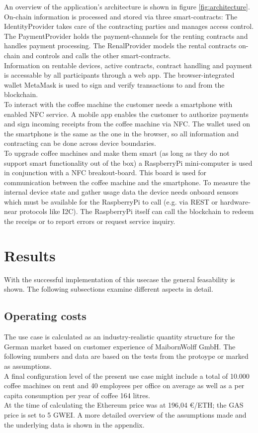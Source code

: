 \documentclass[conference]{IEEEtran}
\begin{document}
An overview of the application's architecture is shown in figure \ref{fig:architecture}. On-chain information is processed and stored via three smart-contracts: The IdentityProvider takes care of the contracting parties and manages access control. The PaymentProvider holds the payment-channels for the renting contracts and handles payment processing. The RenalProvider models the rental contracts on-chain and controls and calls the other smart-contracts.\\
Information on rentable devices, active contracts, contract handling and payment is accessable by all participants through a web app. The browser-integrated wallet MetaMask is used to sign and verify transactions to and from the blockchain.\\
To interact with the coffee machine the customer needs a smartphone with enabled NFC service. A mobile app enables the customer to authorize payments and sign incoming receipts from the coffee machine via NFC. The wallet used on the smartphone is the same as the one in the browser, so all information and contracting can be done across device boundaries.\\
To upgrade coffee machines and make them smart (as long as they do not support smart functionality out of the box) a RaspberryPi mini-computer is used in conjunction with a NFC breakout-board. This board is used for communication between the coffee machine and the smartphone. To measure the internal device state and gather usage data the device needs onboard sensors which must be available for the RaspberryPi to call (e.g. via REST or hardware-near protocols like I2C). The RaspberryPi itself can call the blockchain to redeem the receips or to report errors or request service inquiry.\\



\section{Results}
With the successful implementation of this usecase the general feasability is shown. The following subsections examine different aspects in detail.

\subsection{Operating costs}
The use case is calculated as an industry-realistic quantity structure for the German market based on customer experience of MaibornWolff GmbH. The following numbers and data are based on the tests from the protoype or marked as assumptions.\\
A final configuration level of the present use case might include a total of 10.000 coffee machines on rent and 40 employees per office on average as well as a per capita consumption per year of coffee 164 litres.\\
At the time of calculating the Ethereum price was at 196,04 €/ETH; the GAS price is set to 5 GWEI. A more detailed overview of the assumptions made and the underlying data is shown in the appendix.\\
\end{document}
